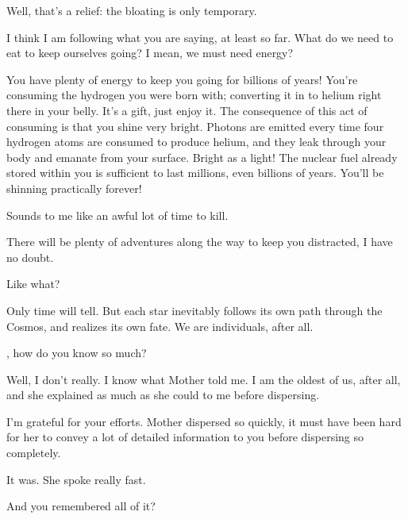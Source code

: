 \documentclass[main.tex]{subfiles}
\begin{document}
\par \Sterope Well, that's a relief: the bloating is only temporary.

\par \Alcyone I think I am following what you are saying, at least so far.  What do we need to eat to keep ourselves going?  I mean, we must need energy?

\par \Maia You have plenty of energy to keep you going for billions of years!  You're consuming the hydrogen you were born with; converting it in to helium right there in your belly.  It's a gift, just enjoy it.  The consequence of this act of consuming is that you shine very bright.  Photons are emitted every time four hydrogen atoms are consumed to produce helium, and they leak through your body and emanate from your surface.  Bright as a light!  The nuclear fuel already stored within you is sufficient to last millions, even billions of years.  You'll be shinning practically forever!

\par \Celaeno Sounds to me like an awful lot of time to kill.

\par \Maia There will be plenty of adventures along the way to keep you distracted, I have no doubt.

\par \Sterope  Like what?  

\par \Maia Only time will tell.  But each star inevitably follows its own path through the Cosmos, and realizes its own fate.  We are individuals, after all.

\par \Sterope \rmmaia, how do you know so much?

\par \Maia Well, I don't really. I know what Mother told me.  I am the oldest of us, after all, and she explained as much as she could to me before dispersing.  

\par \Sterope I'm grateful for your efforts.  Mother dispersed so quickly, it must have been hard for her to convey a lot of detailed information to you before dispersing so completely.

\par \Maia It was.  She spoke really fast.

\par \Sterope And you remembered all of it?
\end{document}
